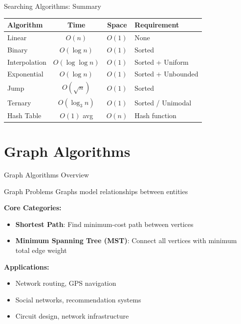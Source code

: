 \documentclass[aspectratio=169,xcolor=dvipsnames]{beamer}
\begin{document}
\begin{frame}{Searching Algorithms: Summary}
  \begin{table}
    \centering
    \small
    \begin{tabular}{lccl}
      \hline
      \textbf{Algorithm} & \textbf{Time} & \textbf{Space} & \textbf{Requirement} \\
      \hline
      Linear & $O(n)$ & $O(1)$ & None \\
      Binary & $O(\log n)$ & $O(1)$ & Sorted \\
      Interpolation & $O(\log \log n)$ & $O(1)$ & Sorted + Uniform \\
      Exponential & $O(\log n)$ & $O(1)$ & Sorted + Unbounded \\
      Jump & $O(\sqrt{n})$ & $O(1)$ & Sorted \\
      Ternary & $O(\log_3 n)$ & $O(1)$ & Sorted / Unimodal \\
      Hash Table & $O(1)$ avg & $O(n)$ & Hash function \\
      \hline
    \end{tabular}
  \end{table}
\end{frame}

\section{Graph Algorithms}

\begin{frame}{Graph Algorithms Overview}
  \begin{block}{Graph Problems}
    Graphs model relationships between entities
  \end{block}

  \vspace{0.3cm}
  \textbf{Core Categories:}
  \begin{itemize}
    \item \textbf{Shortest Path}: Find minimum-cost path between vertices
    \item \textbf{Minimum Spanning Tree (MST)}: Connect all vertices with minimum total edge weight
  \end{itemize}

  \vspace{0.3cm}
  \textbf{Applications:}
  \begin{itemize}
    \item Network routing, GPS navigation
    \item Social networks, recommendation systems
    \item Circuit design, network infrastructure
  \end{itemize}
\end{frame}
\end{document}
